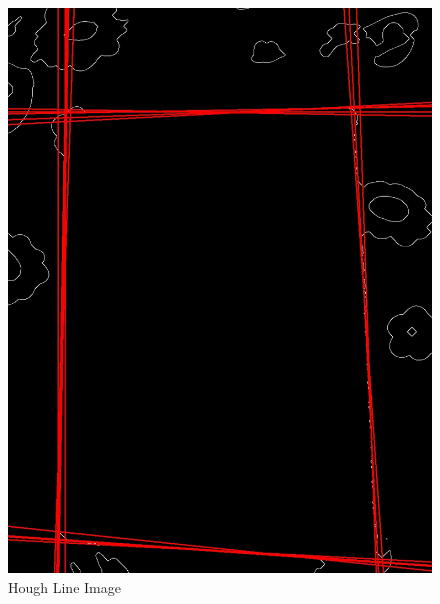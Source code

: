 \begin{enumerate}
\begin{figure}[h]
    \end{figure}
    \begin{figure}[h!]
        \centering
        \begin{minipage}[b]{0.30\linewidth}
            \includegraphics[width=\linewidth]{output/hough_line.jpg}
            \caption{Hough Line Image}
        \end{minipage}
        \hspace{3cm}
        \begin{minipage}[b]{0.30\linewidth}

\end{minipage}
\end{figure}
\end{enumerate}
